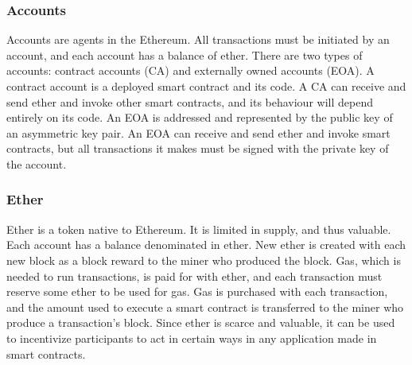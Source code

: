\subsubsection{Accounts}
Accounts are agents in the Ethereum. All transactions must be initiated by an account, and each account has a balance of ether. There are two types of accounts: contract accounts (CA) and externally owned accounts (EOA). A contract account is a deployed smart contract and its code. A CA can receive and send ether and invoke other smart contracts, and its behaviour will depend entirely on its code. An EOA is addressed and represented by the public key of an asymmetric key pair. An EOA can receive and send ether and invoke smart contracts, but all transactions it makes must be signed with the private key of the account. 

\subsubsection{Ether}
Ether is a token native to Ethereum. It is limited in supply, and thus valuable. Each account has a balance denominated in ether. New ether is created with each new block as a block reward to the miner who produced the block. Gas, which is needed to run transactions, is paid for with ether, and each transaction must reserve some ether to be used for gas. Gas is purchased with each transaction, and the amount used to execute a smart contract is transferred to the miner who produce a transaction's block. Since ether is scarce and valuable, it can be used to incentivize participants to act in certain ways in any application made in smart contracts. 